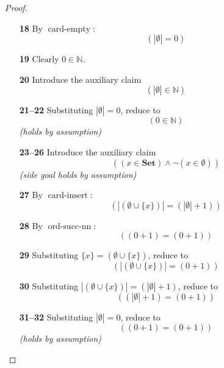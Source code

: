 \documentclass[11pt]{article}
\theoremstyle{plain}
\begin{document}
\begin{proof}
\begin{itemize}[leftmargin=2.8em, itemsep=4pt, parsep=1pt]
  \item[\textbf{18}] By $\operatorname{card\text{-}empty}$:
\begin{equation*}
(|\emptyset| = 0)
\end{equation*}

  \item[\textbf{19}] Clearly $0 \in \mathbb{N}$.
  \item[\textbf{20}] Introduce the auxiliary claim
\begin{equation*}
(|\emptyset| \in \mathbb{N})
\end{equation*}

  \item[\textbf{21--22}] Substituting $|\emptyset| = 0$, reduce to
\begin{equation*}
(0 \in \mathbb{N})
\end{equation*}
  \emph{(holds by assumption)}
  \item[\textbf{23--26}] Introduce the auxiliary claim
\begin{equation*}
((x \in \mathbf{Set}) \wedge \neg (x \in \emptyset))
\end{equation*}
  \emph{(side goal holds by assumption)}
  \item[\textbf{27}] By $\operatorname{card\text{-}insert}$:
\begin{equation*}
(|(\emptyset \cup \{x\})| = (|\emptyset| + 1))
\end{equation*}

  \item[\textbf{28}] By $\operatorname{ord\text{-}succ\text{-}nn}$:
\begin{equation*}
((0 + 1) = (0 + 1))
\end{equation*}

  \item[\textbf{29}] Substituting $\{x\} = (\emptyset \cup \{x\})$, reduce to
\begin{equation*}
(|(\emptyset \cup \{x\})| = (0 + 1))
\end{equation*}

  \item[\textbf{30}] Substituting $|(\emptyset \cup \{x\})| = (|\emptyset| + 1)$, reduce to
\begin{equation*}
((|\emptyset| + 1) = (0 + 1))
\end{equation*}

  \item[\textbf{31--32}] Substituting $|\emptyset| = 0$, reduce to
\begin{equation*}
((0 + 1) = (0 + 1))
\end{equation*}
  \emph{(holds by assumption)}
\end{itemize}
\end{proof}

\bigskip
\end{document}

